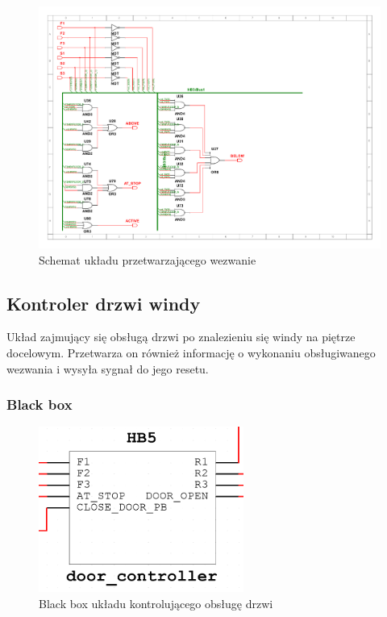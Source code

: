 \documentclass[a4paper]{article}
\begin{document}
\begin{figure}[H]
    \centering
    \includegraphics[width=\textwidth]{direction_controller_schemat.pdf}
    \caption{Schemat układu przetwarzającego wezwanie}
\end{figure}

\subsection{Kontroler drzwi windy}

Układ zajmujący się obsługą drzwi po znalezieniu się windy na piętrze docelowym. 
Przetwarza on również informację o wykonaniu obsługiwanego wezwania
i wysyła sygnał do jego resetu.

\subsubsection{Black box}
\begin{figure}[H]
    \centering
    \includegraphics[width=0.6\textwidth]{door_controller.png}
    \caption{Black box układu kontrolującego obsługę drzwi}
\end{figure}
\end{document}
